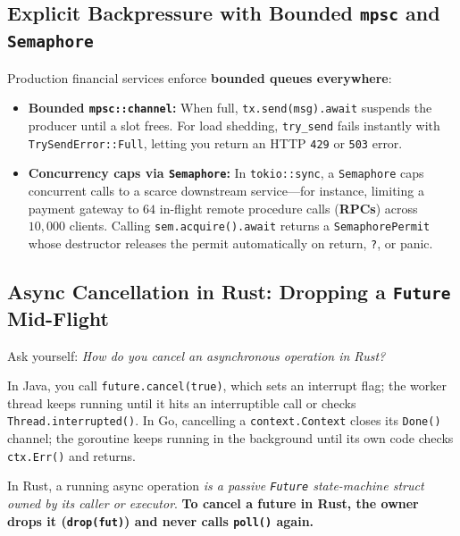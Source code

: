 \subsection{Explicit Backpressure with Bounded \texttt{mpsc} and \texttt{Semaphore}}

Production financial services enforce \textbf{bounded queues everywhere}:
\begin{itemize}
  \item \textbf{Bounded \texttt{mpsc::channel}:} When full, \texttt{tx.send(msg).await} suspends the producer until a slot frees. For load shedding, \texttt{try\_send} fails instantly with \texttt{TrySendError::Full}, letting you return an HTTP \texttt{429} or \texttt{503} error.
  \item \textbf{Concurrency caps via \texttt{Semaphore}:} In \texttt{tokio::sync}, a \texttt{Semaphore} caps concurrent calls to a scarce downstream service---for instance, limiting a payment gateway to $64$ in-flight remote procedure calls (\textbf{RPCs}) across $10{,}000$ clients. Calling \texttt{sem.acquire().await} returns a \texttt{SemaphorePermit} whose destructor releases the permit automatically on return, \texttt{?}, or panic.
\end{itemize}

\subsection{Async Cancellation in Rust: Dropping a \texttt{Future} Mid-Flight}



Ask yourself: \emph{How do you cancel an asynchronous operation in Rust?}

In Java, you call \texttt{future.cancel(true)}, which sets an interrupt flag; the worker thread keeps running until it hits an interruptible call or checks \texttt{Thread.interrupted()}. In Go, cancelling a \texttt{context.Context} closes its \texttt{Done()} channel; the goroutine keeps running in the background until its own code checks \texttt{ctx.Err()} and returns.

In Rust, a running async operation \emph{is a passive \texttt{Future} state-machine struct owned by its caller or executor}. \textbf{To cancel a future in Rust, the owner drops it (\texttt{drop(fut)}) and never calls \texttt{poll()} again.}


